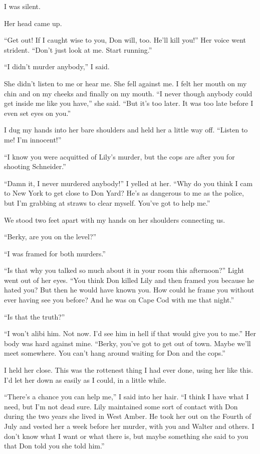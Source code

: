 \documentclass{novel}
\begin{document}
I was silent.

Her head came up.

“Get out! If I caught wise to you, Don will, too. He’ll kill you!” Her voice went strident. “Don’t just look at me. Start running.”

“I didn’t murder anybody,” I said.

She didn’t listen to me or hear me. She fell against me. I felt her mouth on my chin and on my cheeks and finally on my mouth. “I never though anybody could get inside me like you have,” she said. “But it’s too later. It was too late before I even set eyes on you.”

I dug my hands into her bare shoulders and held her a little way off. “Listen to me! I’m innocent!”

“I know you were acquitted of Lily’s murder, but the cops are after you for shooting Schneider.”

“Damn it, I never murdered anybody!” I yelled at her. “Why do you think I cam to New York to get close to Don Yard? He’s as dangerous to me as the police, but I’m grabbing at straws to clear myself. You’ve got to help me.”

We stood two feet apart with my hands on her shoulders connecting us.

“Berky, are you on the level?”

“I was framed for both murders.”

“Is that why you talked so much about it in your room this afternoon?” Light went out of her eyes. “You think Don killed Lily and then framed you because he hated you? But then he would have known you. How could he frame you without ever having see you before? And he was on Cape Cod with me that night.”

“Is that the truth?”

“I won’t alibi him. Not now. I’d see him in hell if that would give you to me.” Her body was hard against mine. “Berky, you’ve got to get out of town. Maybe we’ll meet somewhere. You can’t hang around waiting for Don and the cops.”

\scenestars

I held her close. This was the rottenest thing I had ever done, using her like this. I’d let her down as easily as I could, in a little while.

“There’s a chance you can help me,” I said into her hair. “I think I have what I need, but I’m not dead sure. Lily maintained some sort of contact with Don during the two years she lived in West Amber. He took her out on the Fourth of July and vested her a week before her murder, with you and Walter and others. I don’t know what I want or what there is, but maybe something she said to you that Don told you she told him.”
\end{document}

